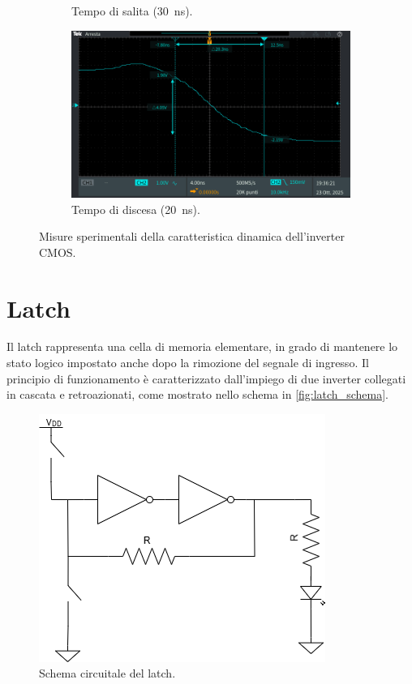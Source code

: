 \documentclass[a4paper,12pt]{article}
\begin{document}
\begin{figure}[h]
\begin{subfigure}[b]{0.48\textwidth}
		\caption{Tempo di salita (\SI{30}{\nano\second}).}
		\label{fig:salita}
	\end{subfigure}
	\hfill
	\begin{subfigure}[b]{0.48\textwidth}
		\centering
		\includegraphics[width=\linewidth]{immagini/inverter/TEK00103.PNG}
		\caption{Tempo di discesa (\SI{20}{\nano\second}).}
		\label{fig:discesa}
	\end{subfigure}
	\caption{Misure sperimentali della caratteristica dinamica dell'inverter CMOS.}
	\label{fig:dinamica_misure}
\end{figure}

\FloatBarrier

\section*{Latch}

Il latch rappresenta una cella di memoria elementare, in grado di mantenere lo stato logico impostato anche dopo la rimozione del segnale di ingresso.
Il principio di funzionamento è caratterizzato dall’impiego di due inverter collegati in cascata e retroazionati, come mostrato nello schema in \autoref{fig:latch_schema}.

\begin{figure}[h]
	\centering
	\includegraphics[width=0.5\linewidth]{immagini/latch/Latch.png}
	\caption{Schema circuitale del latch.}
	\label{fig:latch_schema}
\end{figure}
\end{document}
